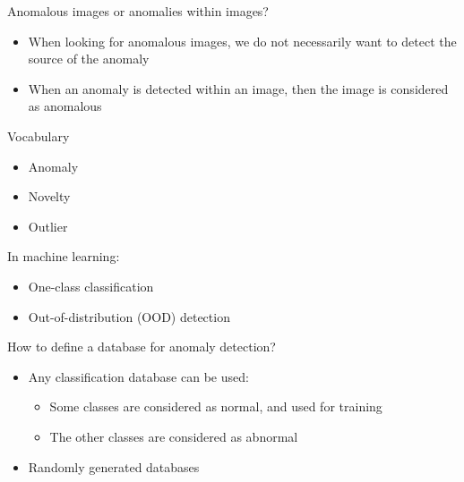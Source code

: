 \documentclass[xcolor=pdftex,dvipsnames,table,mathserif]{beamer}
\begin{document}
\begin{frame}{Anomalous images or anomalies within images?}

  \begin{itemize}
  \item When looking for anomalous images, we do not necessarily want to detect the source of the anomaly
  \item When an anomaly is detected within an image, then the image is considered as anomalous
  \end{itemize}

\end{frame}


\begin{frame}{Vocabulary}

  \begin{itemize}
  \item Anomaly
  \item Novelty
  \item Outlier
  \end{itemize}

  In machine learning:

\begin{itemize}
\item One-class classification
\item Out-of-distribution (OOD) detection
\end{itemize}

\end{frame}


\begin{frame}{How to define a database for anomaly detection?}

\begin{itemize}
\item Any classification database can be used:
  \begin{itemize}
  \item Some classes are considered as normal, and used for training
  \item The other classes are considered as abnormal
  \end{itemize}
\item Randomly generated databases
\end{itemize}

\end{frame}
\end{document}
